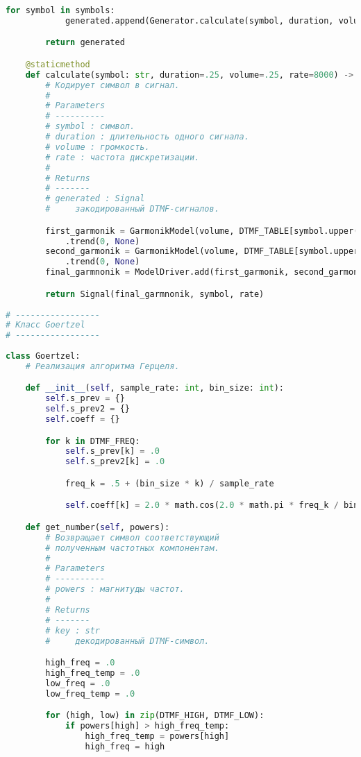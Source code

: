 \begin{lstlisting}[language=python]
        for symbol in symbols:
            generated.append(Generator.calculate(symbol, duration, volume, rate))

        return generated

    @staticmethod
    def calculate(symbol: str, duration=.25, volume=.25, rate=8000) -> Signal:
        # Кодирует символ в сигнал.
        #
        # Parameters
        # ----------
        # symbol : символ.
        # duration : длительность одного сигнала.
        # volume : громкость.
        # rate : частота дискретизации.
        #
        # Returns
        # -------
        # generated : Signal
        #     закодированный DTMF-сигналов.

        first_garmonik = GarmonikModel(volume, DTMF_TABLE[symbol.upper()][0], 0, int(duration * rate), 1, 1 / rate) \
            .trend(0, None)
        second_garmonik = GarmonikModel(volume, DTMF_TABLE[symbol.upper()][1], 0, int(duration * rate), 1, 1 / rate) \
            .trend(0, None)
        final_garmnonik = ModelDriver.add(first_garmonik, second_garmonik)

        return Signal(final_garmnonik, symbol, rate)
     
# -----------------
# Класс Goertzel
# -----------------
     
class Goertzel:
    # Реализация алгоритма Герцеля.

    def __init__(self, sample_rate: int, bin_size: int):
        self.s_prev = {}
        self.s_prev2 = {}
        self.coeff = {}

        for k in DTMF_FREQ:
            self.s_prev[k] = .0
            self.s_prev2[k] = .0

            freq_k = .5 + (bin_size * k) / sample_rate

            self.coeff[k] = 2.0 * math.cos(2.0 * math.pi * freq_k / bin_size)

    def get_number(self, powers):
        # Возвращает символ соответствующий
        # полученным частотных компонентам.
        #
        # Parameters
        # ----------
        # powers : магнитуды частот.
        #
        # Returns
        # -------
        # key : str
        #     декодированный DTMF-символ.

        high_freq = .0
        high_freq_temp = .0
        low_freq = .0
        low_freq_temp = .0

        for (high, low) in zip(DTMF_HIGH, DTMF_LOW):
            if powers[high] > high_freq_temp:
                high_freq_temp = powers[high]
                high_freq = high


\end{lstlisting}
